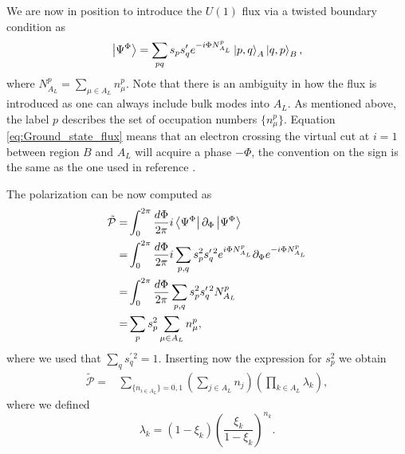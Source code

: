 \documentclass[twocolumn,amsmath,longbibliography,amssymb,superscriptaddress]{revtex4-1}
\begin{document}
We are now in position to introduce the $U(1)$ flux via a twisted boundary condition as
\begin{equation}
\ket{\Psi^\Phi} = \sum_{pq} s_p s_q' e^{-i\Phi N_{A_L}^p} \ket{p,q}_A \ket{q,p}_B,
\label{eq:Ground_state_flux}
\end{equation}
where $N_{A_L}^p = \sum_{\mu \in A_L}n_\mu^p$. Note that there is an ambiguity in how the flux is introduced as one can always include bulk modes into $A_L$. As mentioned above, the label $p$ describes the set of occupation numbers $\{n_\mu^p\}$. Equation \eqref{eq:Ground_state_flux} means that an electron crossing the virtual cut at $i=1$ between region $B$ and $A_L$ will acquire a phase $-\Phi$, the convention on the sign is the same as the one used in reference \cite{Watanabe2018}. 

The polarization can be now computed as
\begin{align}
\tilde{\mathcal{P}} =& \int_0^{2\pi} \frac{d\Phi}{2\pi}i\bra{\Psi^\Phi}\partial_\Phi\ket{\Psi^\Phi} \nonumber\\
=& \int_0^{2\pi} \frac{d\Phi}{2\pi}i\sum_{p,q} s_p^2 s_q^{\prime \, 2} e^{i\Phi N_{A_L}^p}\partial_{\Phi}e^{-i\Phi  N_{A_L}^p}\nonumber\\
=&\int_0^{2\pi} \frac{d\Phi}{2\pi}\sum_{p,q} s_p^2 s_q^{\prime \, 2}  N_{A_L}^p \nonumber\\
=&\sum_{p} s_p^2 \sum_{\mu \in A_L}n^p_\mu,
\end{align}
where we used that $\sum_q s_q^{\prime \,2} = 1$. Inserting now the expression for $s_p^2$ we obtain
\begin{align}
\tilde{\mathcal{P}}=&\sum_{\{n_{i \in A_L}\} = 0,1} \left(\sum_{j\in A_{L}} n_j \right) \left(\prod_{k\in A_L} \lambda_k \right),
\end{align} 
where we defined
\begin{equation}
\lambda_k = (1- \xi_k)\left(\frac{\xi_k}{1-\xi_k} \right)^{n_k}.
\end{equation}
\end{document}
